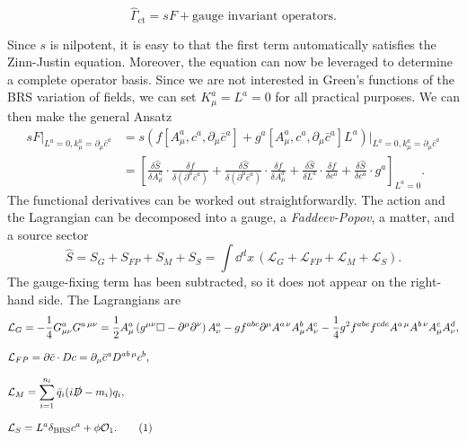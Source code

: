 \begin{equation}
\hat{\Gamma}_{\text{ct}} = s F + \text{gauge invariant operators}.
\end{equation}

Since $s$ is nilpotent, it is easy to that the first term automatically satisfies the Zinn-Justin equation. Moreover, the equation can now be leveraged to determine a complete operator basis. Since we are not interested in Green's functions of the BRS variation of fields, we can set $K^a_\mu = L^a = 0$ for all practical purposes. We can then make the general Ansatz
\begin{equation}
\begin{split}
s F \bigg \vert_{L^a = 0, k^a_\mu = \partial_\mu \bar{c}^a} &= s \left( f[A^a_\mu, c^a, \partial_\mu \bar{c}^a] + g^a [A^a_\mu, c^a, \partial_\mu \bar{c}^a] L^a \right) \bigg \vert_{L^a = 0, k^a_\mu = \partial_\mu \bar{c}^a} \\
& = \left[\frac{\delta \hat{S}}{\delta A^a_\mu} \cdot \frac{\delta f}{\delta (\partial^\mu \bar{c}^a)} + \frac{\delta \hat{S}}{\delta (\partial^\mu \bar{c}^{a})} \cdot \frac{\delta f}{\delta A^a_\mu} + \frac{\delta \hat{S}}{\delta L^a} \cdot \frac{\delta f}{\delta c^a} + \frac{\delta \hat{S}}{\delta c^a} \cdot g^a\right]_{L^a = 0}.
\end{split}
\label{eq:4:sF}
\end{equation}
The functional derivatives can be worked out straightforwardly. The action and the Lagrangian can be decomposed into a gauge, a \textit{Faddeev-Popov}, a matter, and a source sector
\begin{equation}
\hat{S} = S_G + S_{FP} + S_M + S_S = \int \dd^d x\, \left(\mathcal{L}_G + \mathcal{L}_{FP} + \mathcal{L}_M + \mathcal{L}_S \right).
\end{equation}
The gauge-fixing term has been subtracted, so it does not appear on the right-hand side. The Lagrangians are
\begin{align*}
&\mathcal{L}_G = - \frac{1}{4} G^a_{\mu \nu} G^{a\, \mu \nu} = \frac{1}{2} A^a_\mu \left( g^{\mu \nu} \Box - \partial^\mu \partial^\nu \right) A^a_\nu - g f^{abc} \partial^\mu A^{a\, \nu} A^b_\mu A^c_\nu - \frac{1}{4} g^2 f^{abe} f^{cd e} A^{a\, \mu } A^{b \, \nu} A^c_\mu A^d_\nu, \\[8pt]
&\mathcal{L}_{FP} = \partial \bar{c} \cdot D c = \partial_\mu \bar{c}^a D^{ab\, \mu} c^b, \\[8pt]
&\mathcal{L}_M =  \sum_{i = 1}^{n_l} \bar{q}_i (i\slashed{D} - m_i) q_i, \\[8pt]
&\mathcal{L}_S = L^a \delta_{\text{BRS}} c^a  + \phi \mathcal{O}_1.
\refstepcounter{equation}
\tag{\theequation}
\end{align*}
